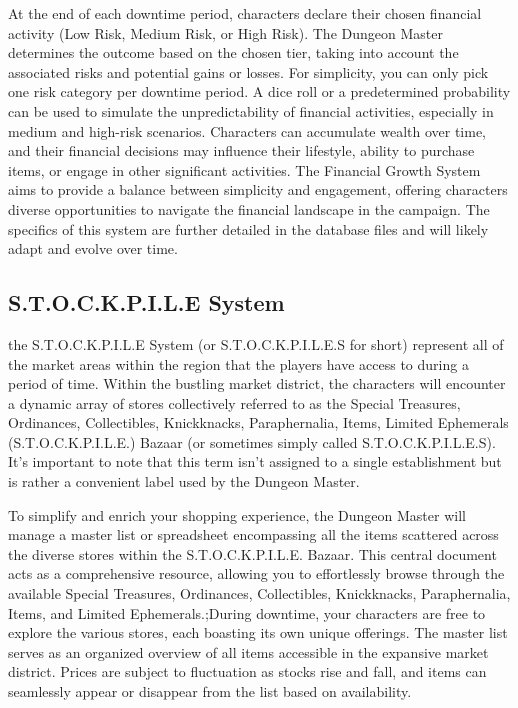 At the end of each downtime period, characters declare their chosen financial activity (Low Risk, Medium Risk, or High Risk). The Dungeon Master determines the outcome based on the chosen tier, taking into account the associated risks and potential gains or losses. For simplicity, you can only pick one risk category per downtime period. A dice roll or a predetermined probability can be used to simulate the unpredictability of financial activities, especially in medium and high-risk scenarios. Characters can accumulate wealth over time, and their financial decisions may influence their lifestyle, ability to purchase items, or engage in other significant activities. The Financial Growth System aims to provide a balance between simplicity and engagement, offering characters diverse opportunities to navigate the financial landscape in the campaign. The specifics of this system are further detailed in the database files and will likely adapt and evolve over time.

\subsection{S.T.O.C.K.P.I.L.E System\label{S.T.O.C.K.P.I.L.E}}

the S.T.O.C.K.P.I.L.E System (or S.T.O.C.K.P.I.L.E.S for short) represent all of the market areas within the region that the players have access to during a period of time. Within the bustling market district, the characters will encounter a dynamic array of stores collectively referred to as the Special Treasures, Ordinances, Collectibles, Knickknacks, Paraphernalia, Items, Limited Ephemerals (S.T.O.C.K.P.I.L.E.) Bazaar (or sometimes simply called S.T.O.C.K.P.I.L.E.S). It's important to note that this term isn't assigned to a single establishment but is rather a convenient label used by the Dungeon Master.

To simplify and enrich your shopping experience, the Dungeon Master will manage a master list or spreadsheet encompassing all the items scattered across the diverse stores within the S.T.O.C.K.P.I.L.E. Bazaar. This central document acts as a comprehensive resource, allowing you to effortlessly browse through the available Special Treasures, Ordinances, Collectibles, Knickknacks, Paraphernalia, Items, and Limited Ephemerals.;During downtime, your characters are free to explore the various stores, each boasting its own unique offerings. The master list serves as an organized overview of all items accessible in the expansive market district. Prices are subject to fluctuation as stocks rise and fall, and items can seamlessly appear or disappear from the list based on availability.

